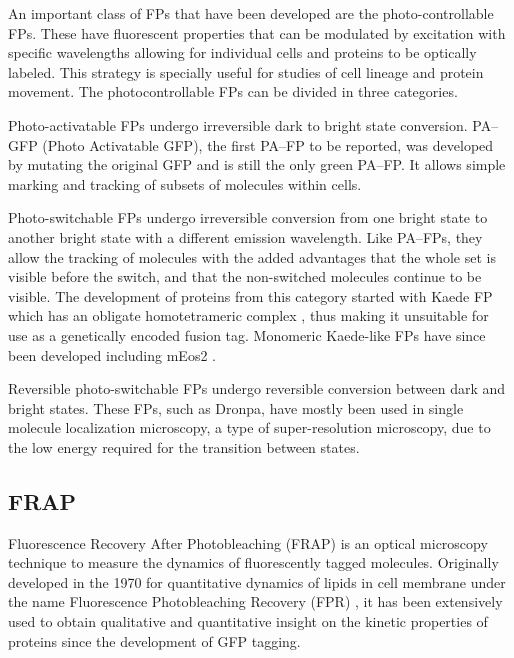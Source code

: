     An important class of FPs that have been developed are the
    photo-controllable FPs.
    These have
    fluorescent properties that can be modulated by excitation with specific
    wavelengths allowing for individual cells and proteins to be optically
    labeled.  This strategy is specially useful for studies of cell
    lineage and protein movement.
    The photocontrollable FPs can be divided in three categories.


    Photo-activatable FPs undergo
        irreversible dark to bright state conversion.
        PA--GFP (Photo Activatable GFP), the first PA--FP to be
        reported, was developed by mutating the original GFP
        \citep{pagfp-discovery} and is
        still the only green PA--FP.
        It allows simple marking and tracking of subsets of molecules
        within cells.

    Photo-switchable FPs undergo
        irreversible conversion from one bright state to another bright
        state with a different emission wavelength.
        Like PA--FPs, they allow the tracking of
        molecules with the added advantages that the whole set is visible
        before the switch, and that the non-switched molecules continue
        to be visible.
        The development of proteins from this category started with Kaede FP
        which has an obligate homotetrameric
        complex \citep{kaede-discovery}, thus making it
        unsuitable for use as a genetically encoded fusion tag.
        Monomeric Kaede-like FPs have since been developed including
        mEos2 \citep{meos2-discovery}.

    Reversible photo-switchable FPs undergo
        reversible conversion between dark and bright states.
        These FPs, such as Dronpa, have mostly been used in
        single molecule localization
        microscopy, a type of super-resolution microscopy, due to the
        low energy required for the transition between states.

  \subsection{FRAP}

    Fluorescence Recovery After Photobleaching (FRAP) is an optical
    microscopy technique to measure the dynamics of fluorescently
    tagged molecules.
    Originally developed in the 1970 for quantitative dynamics of lipids
    in cell membrane under the name Fluorescence Photobleaching
    Recovery (FPR) \citep{axelrod1976mobility}, it has
    been extensively used to obtain qualitative and quantitative
    insight on the kinetic properties of proteins since the development
    of GFP tagging.

